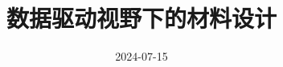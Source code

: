 
\title{数据驱动视野下的材料设计}
\author[ ]{}   %
\renewcommand*{\Authfont}{\small\rm} %
\renewcommand*{\Affilfont}{\small\it} %
\renewcommand\Authands{ and } %
\renewcommand\Authands{ , } %
\date{} %
\date{2024-07-15}									     %


